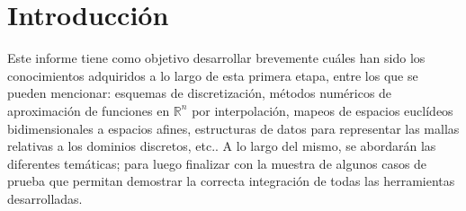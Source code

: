 \documentclass[../informe.tex]{subfiles}
\begin{document}
\section{Introducción}
\label{sec:intro}
Este informe tiene como objetivo desarrollar brevemente cuáles han
sido los conocimientos adquiridos a lo largo de esta primera etapa, entre los que se pueden mencionar: esquemas de discretización, métodos
numéricos de aproximación de funciones en $\mathbb{R}^n$ por interpolación, mapeos de espacios euclídeos bidimensionales a espacios afines, estructuras de datos para representar las mallas relativas a los dominios discretos, etc.. A lo largo del mismo, se abordarán las diferentes temáticas; para luego finalizar con la muestra de algunos casos de prueba que permitan demostrar la correcta integración de todas las herramientas desarrolladas.
\end{document}
